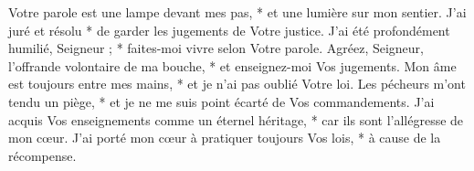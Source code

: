 Votre parole est une lampe devant mes pas, * et une lumière sur mon sentier.
\versseparator
J'ai juré et résolu * de garder les jugements de Votre justice.
\versseparator
J'ai été profondément humilié, Seigneur ; * faites-moi vivre selon Votre parole.
\versseparator
Agréez, Seigneur, l'offrande volontaire de ma bouche, * et enseignez-moi Vos jugements.
\versseparator
Mon âme est toujours entre mes mains, * et je n'ai pas oublié Votre loi.
\versseparator
Les pécheurs m'ont tendu un piège, * et je ne me suis point écarté de Vos commandements.
\versseparator
J'ai acquis Vos enseignements comme un éternel héritage, * car ils sont l'allégresse de mon cœur.
\versseparator
J'ai porté mon cœur à pratiquer toujours Vos lois, * à cause de la récompense.